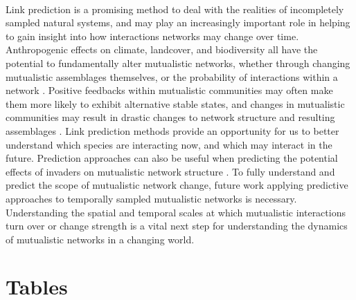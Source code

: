 \documentclass[openacc]{rsproca_new}%
\begin{document}
\paragraph*{}
Link prediction is a promising method to deal with the realities of incompletely sampled natural systems, and may play an increasingly important role in helping to gain insight into how interactions networks may change over time. Anthropogenic effects on climate, landcover, and biodiversity all have the potential to fundamentally alter mutualistic networks, whether through changing mutualistic assemblages themselves, or the probability of interactions within a network \cite{tylianakis2017ecological, memmott2007global, teixido2022anthropogenic}. Positive feedbacks within mutualistic communities may often make them more likely to exhibit alternative stable states, and changes in mutualistic communities may result in drastic changes to network structure and resulting assemblages \cite{lever2014sudden, bascompte2022resilience}. Link prediction methods provide an opportunity for us to better understand which species are interacting now, and which may interact in the future. Prediction approaches can also be useful when predicting the potential effects of invaders on mutualistic network structure \cite{fricke2020accelerating,traveset2014mutualistic}. To fully understand and predict the scope of mutualistic network change, future work applying predictive approaches to temporally sampled mutualistic networks is necessary. Understanding the spatial and temporal scales at which mutualistic interactions turn over or change strength is a vital next step for understanding the dynamics of mutualistic networks in a changing world.





\clearpage



\clearpage 

\section*{Tables} 
\end{document}
